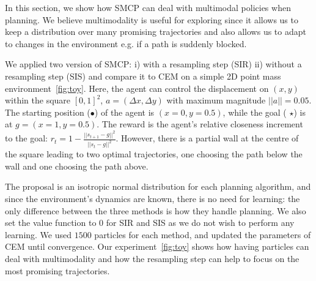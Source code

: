 In this section, we show how SMCP can deal with multimodal policies when planning.
We believe multimodality is useful for exploring since it allows us to keep a distribution over many promising trajectories and also allows us to adapt to changes in the environment e.g. if a path is suddenly blocked.

We applied two version of SMCP: i) with a resampling step (SIR) ii) without a resampling step (SIS) and compare it to CEM on a simple 2D point mass environment~\ref{fig:toy}. Here, the agent can control the displacement on $(x,y)$ within the square $[0,1]^2$, $a = (\Delta x, \Delta y)$ with maximum magnitude $||a|| = 0.05$. The starting position ($\bullet$) of the agent is $(x=0, y=0.5)$, while the goal ({\color{red} $\star$}) is at $g = (x=1, y=0.5)$. The reward is the agent's relative closeness increment to the goal: $r_t = 1- \frac{||s_{t+1} -g||^2}{||s_t -g||^2}$. However, there is a partial wall at the centre of the square leading to two optimal trajectories, one choosing the path below the wall and one choosing the path above.

The proposal is an isotropic normal distribution for each planning algorithm, and since the environment's dynamics are known, there is no need for learning: the only difference between the three methods is how they handle planning. We also set the value function to $0$ for SIR and SIS as we do not wish to perform any learning. We used $1500$ particles for each method, and updated the parameters of CEM until convergence. Our experiment~\ref{fig:toy} shows how having particles can deal with multimodality and how the resampling step can help to focus on the most promising trajectories. 



